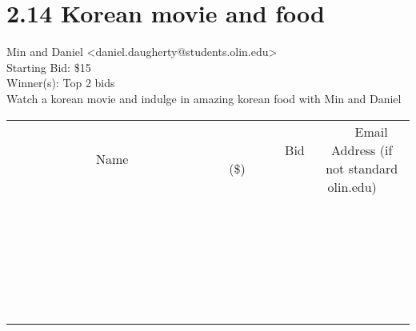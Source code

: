 \documentclass[11pt]{article}
\begin{document}
					\section*{2.14 Korean movie and food}
					Min and Daniel <daniel.daugherty@students.olin.edu> \\
					Starting Bid: \$15 \\
					Winner(s): Top 2 bids \\
					Watch a korean movie and indulge in amazing korean food with Min and Daniel \\
					[6ex]
					\begin{tabular}{c c c}
						~~~~~~~~~~~~~Name~~~~~~~~~~~~~ & ~~~~~~~~~Bid (\$)~~~~~~~~~ & ~~~Email Address (if not standard olin.edu)~~~ \\
				
 & & \\
\hline
 & & \\
\hline
 & & \\
\hline
 & & \\
\hline
 & & \\
\hline
 & & \\
\hline
 & & \\
\hline
 & & \\
\hline
 & & \\
\hline
 & & \\
\hline
 & & \\
\hline
 & & \\
\hline
 & & \\
\hline
 & & \\
\hline
 & & \\
\hline
 & & \\
\hline
 & & \\
\hline
 & & \\
\hline
 & & \\
\hline
 & & \\
\hline
 & & \\
\hline
 & & \\
\hline
 & & \\
\hline
 & & \\
\hline
 & & \\
\hline
 & & \\
\hline
					\end{tabular}
					\clearpage
				
\end{document}
